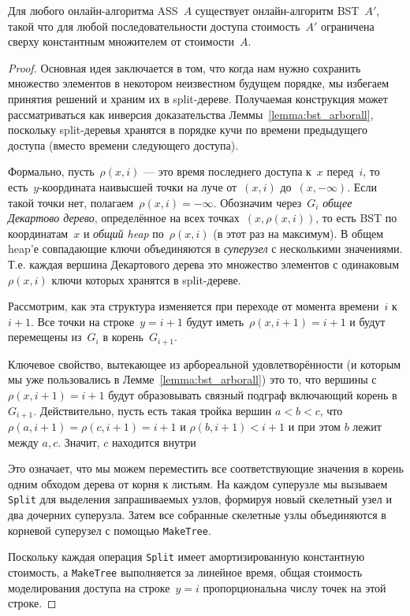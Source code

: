 \documentclass[a4paper,11pt]{article}
\begin{document}
\begin{lemma} \label{lemma:online_bst_arborall}
Для любого онлайн-алгоритма ASS~$A$ существует онлайн-алгоритм BST~$A'$, такой что для любой последовательности доступа стоимость~$A'$ ограничена сверху константным множителем от стоимости~$A$.
\end{lemma}
\begin{proof}
Основная идея заключается в том, что когда нам нужно сохранить множество элементов в некотором неизвестном будущем порядке, мы избегаем принятия решений и храним их в split-дереве. Получаемая конструкция может рассматриваться как инверсия доказательства Леммы~\ref{lemma:bst_arborall}, поскольку split-деревья хранятся в порядке кучи по времени предыдущего доступа (вместо времени следующего доступа).

Формально, пусть~$\rho(x, i)$ — это время последнего доступа к~$x$ перед~$i$, то есть~$y$-координата наивысшей точки на луче от~$(x, i)$ до~$(x, -\infty)$. Если такой точки нет, полагаем~$\rho(x, i) = -\infty$. 
Обозначим через~$G_i$ \emph{общее Декартово дерево}, определённое на всех точках~$(x, \rho(x, i))$, то есть BST по координатам~$x$ и \emph{общий heap} по~$\rho(x, i)$ (в этот раз на максимум). В общем heap'е совпадающие ключи объединяются в \textit{суперузел} с несколькими значениями.
Т.е. каждая вершина Декартового дерева это множество элементов с одинаковым $\rho(x, i)$ ключи которых хранятся в split-дереве.

Рассмотрим, как эта структура изменяется при переходе от момента времени~$i$ к~$i+1$. Все точки на строке~$y = i+1$ будут иметь~$\rho(x, i+1) = i+1$ и будут перемещены из~$G_i$ в корень~$G_{i+1}$. 

Ключевое свойство, вытекающее из арбореальной удовлетворённости (и которым мы уже пользовались в Лемме~\ref{lemma:bst_arborall}) это то, что вершины с $\rho(x, i + 1) = i + 1$ будут образовывать связный подграф включающий корень в $G_{i + 1}$. 
Действительно, пусть есть такая тройка вершин $a < b < c$, что $\rho(a, i + 1) = \rho(c, i + 1) = i + 1$ и $\rho(b, i + 1) < i + 1$ и при этом $b$ лежит между $a, c$.
Значит, $c$ находится внутри 

Это означает, что мы можем переместить все соответствующие значения в корень одним обходом дерева от корня к листьям. На каждом суперузле мы вызываем \texttt{Split} для выделения запрашиваемых узлов, формируя новый скелетный узел и два дочерних суперузла. Затем все собранные скелетные узлы объединяются в корневой суперузел с помощью \texttt{MakeTree}. 

Поскольку каждая операция \texttt{Split} имеет амортизированную константную стоимость, а \texttt{MakeTree} выполняется за линейное время, общая стоимость моделирования доступа на строке~$y = i$ пропорциональна числу точек на этой строке.
\end{proof}
\end{document}
